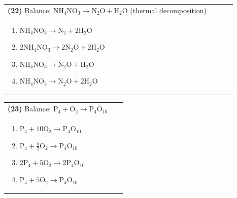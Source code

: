 \documentclass{article}
\begin{document}
\vspace{0.2cm}
\noindent \begin{tabular}{|p{0.9\linewidth}|}
\hline
\vspace{0.2cm}
\textbf{(22)} Balance: \(\mathrm{NH_4NO_3 \rightarrow N_2O + H_2O}\) (thermal decomposition)\\
\begin{minipage}[t]{0.85\linewidth}
\begin{enumerate}[label=\alph*.]
   \item \(\mathrm{NH_4NO_3 \rightarrow N_2 + 2H_2O}\)
   \item \(\mathrm{2NH_4NO_3 \rightarrow 2N_2O + 2H_2O}\)
   \item \(\mathrm{NH_4NO_3 \rightarrow N_2O + H_2O}\)
   \item \(\mathrm{NH_4NO_3 \rightarrow N_2O + 2H_2O}\)
\end{enumerate}
\end{minipage}\\
\hline
\end{tabular}

\vspace{0.2cm}
\noindent \begin{tabular}{|p{0.9\linewidth}|}
\hline
\vspace{0.2cm}
\textbf{(23)} Balance: \(\mathrm{P_4 + O_2 \rightarrow P_4O_{10}}\)\\
\begin{minipage}[t]{0.85\linewidth}
\begin{enumerate}[label=\alph*.]
   \item \(\mathrm{P_4 + 10O_2 \rightarrow P_4O_{10}}\)
   \item \(\mathrm{P_4 + \tfrac{5}{2}O_2 \rightarrow P_4O_{10}}\)
   \item \(\mathrm{2P_4 + 5O_2 \rightarrow 2P_4O_{10}}\)
   \item \(\mathrm{P_4 + 5O_2 \rightarrow P_4O_{10}}\)
\end{enumerate}
\end{minipage}\\
\hline
\end{tabular}
\end{document}
